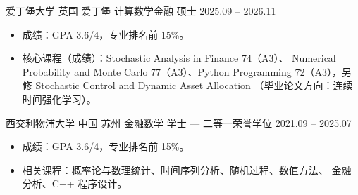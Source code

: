 \entry
    {爱丁堡大学}
    {英国 爱丁堡}
    {计算数学金融 硕士}
    {2025.09 -- 2026.11}
\begin{itemize}
    \item 成绩：GPA 3.6/4，专业排名前 15\%。
    \item 核心课程（成绩）：Stochastic Analysis in Finance 74（A3）、
    Numerical Probability and Monte Carlo 77（A3）、Python Programming
    72（A3），另修 Stochastic Control and Dynamic Asset Allocation
    （毕业论文方向：连续时间强化学习）。
\end{itemize}

\entry
    {西交利物浦大学}
    {中国 苏州}
    {金融数学 学士 --- 二等一荣誉学位}
    {2021.09 -- 2025.07}
\begin{itemize}
    \item 成绩：GPA 3.6/4，专业排名前 15\%。
    \item 相关课程：概率论与数理统计、时间序列分析、随机过程、数值方法、
    金融分析、C++ 程序设计。
\end{itemize}
